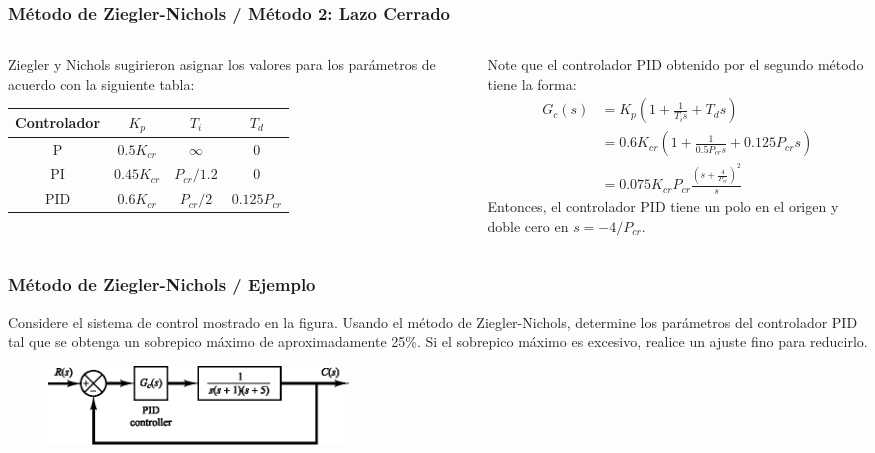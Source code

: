 \documentclass[aspectratio=169,handout]{beamer}
\theoremstyle{definition}
\theoremstyle{plain}
\theoremstyle{remark}
\begin{document}
\begin{frame}[<+->]\frametitle{Método de Ziegler-Nichols / Método 2: Lazo Cerrado}
\begin{columns}
\begin{column}{0.5\textwidth}
	Ziegler y Nichols sugirieron asignar los valores para los parámetros de acuerdo con la siguiente tabla:
	\footnotesize
	\begin{table}
	\begin{tabular}{c|c|c|c}
		Controlador & $K_p$ & $T_i$ & $T_d$\\
		\hline
		P   & $0.5  K_{cr}$ & $\infty$ & 0\\
		PI  & $0.45 K_{cr}$ & $P_{cr}/1.2$ & 0\\
		PID & $0.6  K_{cr}$ & $P_{cr}/2$ & $0.125P_{cr}$
	\end{tabular}
	\end{table}
\end{column}	
\begin{column}{0.5\textwidth}
\small
Note que el controlador PID obtenido por el segundo método tiene la forma:
\begin{align*}
	G_c(s) &= K_p\left( 1 + \frac{1}{T_i s} + T_d s \right)\\
	&= 0.6 K_{cr} \left( 1 + \frac{1}{0.5 P_{cr}s} + 0.125 P_{cr}s \right)\\
	&= 0.075K_{cr}P_{cr} \frac{\left( s + \frac{4}{P_{cr}} \right)^2}{s}
\end{align*}
Entonces, el controlador PID tiene un polo en el origen y doble cero en $s = -4/P_{cr}$.
\end{column}	
\end{columns}
\end{frame}

\begin{frame}[<+->]\frametitle{Método de Ziegler-Nichols / Ejemplo}
Considere el sistema de control mostrado en la figura. Usando el método de Ziegler-Nichols, determine los parámetros del controlador PID tal que se obtenga un sobrepico máximo de aproximadamente 25\%. Si el sobrepico máximo es excesivo, realice un ajuste fino para reducirlo.
\begin{figure}
\includegraphics[width=8cm]{images/ejemplo1.eps}
\end{figure}
\end{frame}
\end{document}
